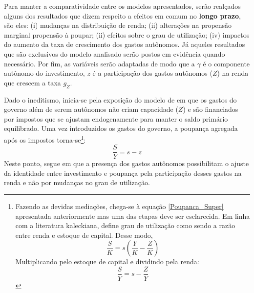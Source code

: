 Para manter a comparatividade entre os modelos apresentados, serão realçados alguns dos resultados que dizem respeito a efeitos em comum no \textbf{longo prazo}, são eles: (i) mudanças na distribuição de renda; (ii) alterações na propensão marginal propensão à poupar; (ii) efeitos sobre o grau de utilização; (iv) impactos do aumento da taxa de crescimento dos gastos autônomos. Já aqueles resultados que são exclusivos do modelo analisado serão postos em evidência quando necessário. Por fim, as variáveis serão adaptadas de modo que a $\gamma$ é o componente autônomo do investimento,  $z$ é a participação dos gastos autônomos ($Z$) na renda que crescem a taxa $g_Z$.


Dado o ineditismo, inicia-se pela exposição do modelo de \textcite{allain_tackling_2015} em que os gastos do governo além de serem autônomos não criam capacidade ($Z$) e são financiados por impostos que se ajustam endogenamente para manter o saldo primário equilibrado.  Uma vez introduzidos os gastos do governo, a poupança agregada após os impostos torna-se\footnote{Fazendo as devidas mediações, chega-se à equação \ref{Poupanca_Super} apresentada anteriormente mas uma das etapas deve ser esclarecida. Em linha com a literatura kaleckiana, \textcite{allain_tackling_2015} define grau de utilização como sendo a razão entre renda e estoque de capital. Desse modo, 
	$$
	\frac{S}{K} = s\left(\frac{Y}{K} - \frac{Z}{K}\right) 
	$$
	Multiplicando pelo estoque de capital e dividindo pela renda:
	$$
	\frac{S}{Y} = s - \frac{Z}{Y}
	$$}:
$$
\frac{S}{Y} = s - z
$$
 Neste ponto, \textcite[p.~10]{allain_tackling_2015} segue \textcite{serrano_sraffian_1995} em que a presença dos gastos autônomos possibilitam o ajuste da identidade entre investimento e poupança pela participação desses gastos na renda e não por mudanças no grau de utilização. 

